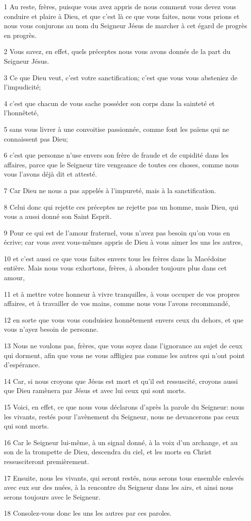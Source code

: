 \par 1 Au reste, frères, puisque vous avez appris de nous comment vous devez vous conduire et plaire à Dieu, et que c'est là ce que vous faites, nous vous prions et nous vous conjurons au nom du Seigneur Jésus de marcher à cet égard de progrès en progrès.
\par 2 Vous savez, en effet, quels préceptes nous vous avons donnés de la part du Seigneur Jésus.
\par 3 Ce que Dieu veut, c'est votre sanctification; c'est que vous vous absteniez de l'impudicité;
\par 4 c'est que chacun de vous sache posséder son corps dans la sainteté et l'honnêteté,
\par 5 sans vous livrer à une convoitise passionnée, comme font les païens qui ne connaissent pas Dieu;
\par 6 c'est que personne n'use envers son frère de fraude et de cupidité dans les affaires, parce que le Seigneur tire vengeance de toutes ces choses, comme nous vous l'avons déjà dit et attesté.
\par 7 Car Dieu ne nous a pas appelés à l'impureté, mais à la sanctification.
\par 8 Celui donc qui rejette ces préceptes ne rejette pas un homme, mais Dieu, qui vous a aussi donné son Saint Esprit.
\par 9 Pour ce qui est de l'amour fraternel, vous n'avez pas besoin qu'on vous en écrive; car vous avez vous-mêmes appris de Dieu à vous aimer les uns les autres,
\par 10 et c'est aussi ce que vous faites envers tous les frères dans la Macédoine entière. Mais nous vous exhortons, frères, à abonder toujours plus dans cet amour,
\par 11 et à mettre votre honneur à vivre tranquilles, à vous occuper de vos propres affaires, et à travailler de vos mains, comme nous vous l'avons recommandé,
\par 12 en sorte que vous vous conduisiez honnêtement envers ceux du dehors, et que vous n'ayez besoin de personne.
\par 13 Nous ne voulons pas, frères, que vous soyez dans l'ignorance au sujet de ceux qui dorment, afin que vous ne vous affligiez pas comme les autres qui n'ont point d'espérance.
\par 14 Car, si nous croyons que Jésus est mort et qu'il est ressuscité, croyons aussi que Dieu ramènera par Jésus et avec lui ceux qui sont morts.
\par 15 Voici, en effet, ce que nous vous déclarons d'après la parole du Seigneur: nous les vivants, restés pour l'avènement du Seigneur, nous ne devancerons pas ceux qui sont morts.
\par 16 Car le Seigneur lui-même, à un signal donné, à la voix d'un archange, et au son de la trompette de Dieu, descendra du ciel, et les morts en Christ ressusciteront premièrement.
\par 17 Ensuite, nous les vivants, qui seront restés, nous serons tous ensemble enlevés avec eux sur des nuées, à la rencontre du Seigneur dans les airs, et ainsi nous serons toujours avec le Seigneur.
\par 18 Consolez-vous donc les uns les autres par ces paroles.


